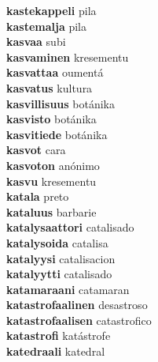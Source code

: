 \textbf{kastekappeli } pila \\
\textbf{kastemalja } pila \\
\textbf{kasvaa } subi \\
\textbf{kasvaminen } kresementu \\
\textbf{kasvattaa } oumentá \\
\textbf{kasvatus } kultura \\
\textbf{kasvillisuus } botánika \\
\textbf{kasvisto } botánika \\
\textbf{kasvitiede } botánika \\
\textbf{kasvot } cara \\
\textbf{kasvoton } anónimo \\
\textbf{kasvu } kresementu \\
\textbf{katala } preto \\
\textbf{kataluus } barbarie \\
\textbf{katalysaattori } catalisado \\
\textbf{katalysoida } catalisa \\
\textbf{katalyysi } catalisacion \\
\textbf{katalyytti } catalisado \\
\textbf{katamaraani } catamaran \\
\textbf{katastrofaalinen } desastroso \\
\textbf{katastrofaalisen } catastrofico \\
\textbf{katastrofi } katástrofe \\
\textbf{katedraali } katedral \\
